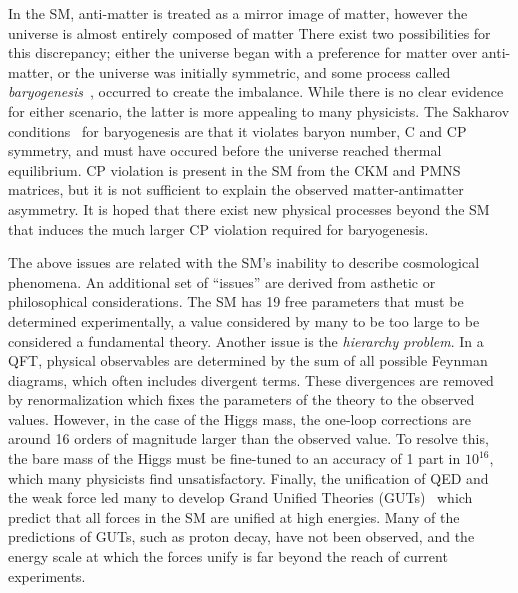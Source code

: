 In the SM, anti-matter is treated as a mirror image of matter, however the universe is almost entirely composed of matter \cite{AlexDM1, AlexDM2}
There exist two possibilities for this discrepancy; either the universe began with a preference for matter over anti-matter, or the universe was initially symmetric, and some process called \textit{baryogenesis}~\cite{BaryosynthesisOriginGalaxies}, occurred to create the imbalance.
While there is no clear evidence for either scenario, the latter is more appealing to many physicists.
The Sakharov conditions~\cite{Sakharov1967} for baryogenesis are that it violates baryon number, C and CP symmetry, and must have occured before the universe reached thermal equilibrium.
CP violation is present in the SM from the CKM and PMNS matrices, but it is not sufficient to explain the observed matter-antimatter asymmetry.
It is hoped that there exist new physical processes beyond the SM that induces the much larger CP violation required for baryogenesis.

The above issues are related with the SM's inability to describe cosmological phenomena.
An additional set of ``issues'' are derived from asthetic or philosophical considerations.
The SM has 19 free parameters that must be determined experimentally, a value considered by many to be too large to be considered a fundamental theory.
Another issue is the \textit{hierarchy problem}.
In a QFT, physical observables are determined by the sum of all possible Feynman diagrams, which often includes divergent terms.
These divergences are removed by renormalization which fixes the parameters of the theory to the observed values.
However, in the case of the Higgs mass, the one-loop corrections are around 16 orders of magnitude larger than the observed value.
To resolve this, the bare mass of the Higgs must be fine-tuned to an accuracy of 1 part in $10^{16}$, which many physicists find unsatisfactory.
Finally, the unification of QED and the weak force led many to develop Grand Unified Theories (GUTs)~\cite{GUT1, GUT2} which predict that all forces in the SM are unified at high energies.
Many of the predictions of GUTs, such as proton decay, have not been observed, and the energy scale at which the forces unify is far beyond the reach of current experiments.
